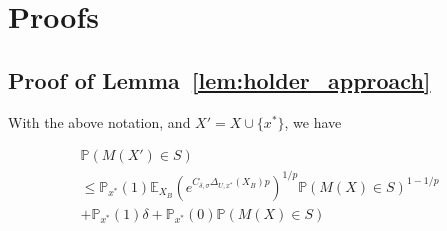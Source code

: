 

\section{Proofs}

\subsection{Proof of Lemma~\ref{lem:holder_approach}}
\label{proof:holder_approach}

\begin{lemma}
\label{lem:holder_approach}
With the above notation, and $X' = X \cup \{x^*\}$, we have 


\begin{multline}
    \mathbb{P}(M(X') \in S) \\ \leq \mathbb{P}_{x^*}(1) \mathbb{E}_{X_B}(e^{C_{\delta,\sigma} \Delta_{U,x^*}(X_B)p})^{1/p} \mathbb{P}(M(X) \in S)^{1-1/p} \\ + \mathbb{P}_{x^*}(1)\delta + \mathbb{P}_{x^*}(0) \mathbb{P}(M(X) \in S)
\end{multline}

\end{lemma}

